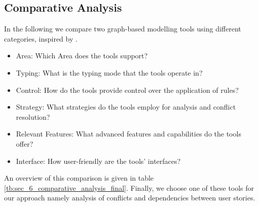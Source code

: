 \subsection{Comparative Analysis}\label{sec_6_comparative_analysis}
In the following we compare two graph-based modelling tools using different categories, inspired by \cite{ghamarian2012modelling}. 
\begin{itemize}
\item Area: Which Area does the tools support?
\item Typing: What is the typing mode that the tools operate in?
\item Control: How do the tools provide control over the application of rules?
\item Strategy: What strategies do the tools employ for analysis and conflict resolution?
\item Relevant Features: What advanced features and capabilities do the tools offer?
\item Interface: How user-friendly are the tools' interfaces?
\end{itemize}
An overview of this comparison is given in table \ref{tb:sec_6_comparative_analysis_final}. Finally, we choose one of these tools for our approach namely analysis of conflicts and dependencies between user stories.

